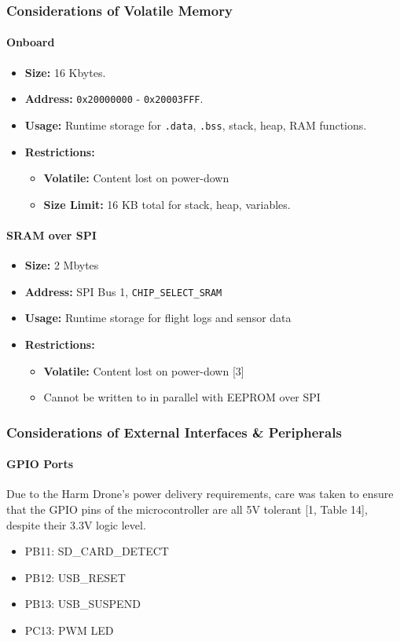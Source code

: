 \documentclass[12pt]{article}
\begin{document}
\subsubsection{Considerations of Volatile Memory}
\paragraph{Onboard}
\begin{itemize}
    \item \textbf{Size:} 16 Kbytes.
    \item \textbf{Address:} \texttt{0x20000000} - \texttt{0x20003FFF}.
    \item \textbf{Usage:} Runtime storage for \texttt{.data}, \texttt{.bss}, stack, heap, RAM functions.
    \item \textbf{Restrictions:}
    \begin{itemize}
        \item \textbf{Volatile:} Content lost on power-down
        \item \textbf{Size Limit:} 16 KB total for stack, heap, variables.
    \end{itemize}
\end{itemize}
\paragraph{SRAM over SPI}
\begin{itemize}
    \item \textbf{Size:} 2 Mbytes
    \item \textbf{Address:} SPI Bus 1, \verb|CHIP_SELECT_SRAM|
    \item \textbf{Usage:} Runtime storage for flight logs and sensor data
    \item \textbf{Restrictions:}
    \begin{itemize}
        \item \textbf{Volatile:} Content lost on power-down [3]
        \item Cannot be written to in parallel with EEPROM over SPI
    \end{itemize}
\end{itemize}

\subsubsection{Considerations of External Interfaces \& Peripherals}
\paragraph{GPIO Ports} Due to the Harm Drone's power delivery requirements, care was taken to ensure that the GPIO pins of the microcontroller are all 5V tolerant [1, Table 14], despite their 3.3V logic level.
\begin{itemize}
	\item PB11: SD\_CARD\_DETECT
	\item PB12: USB\_RESET
	\item PB13: USB\_SUSPEND
    \item PC13: PWM LED
\end{itemize}
\end{document}
